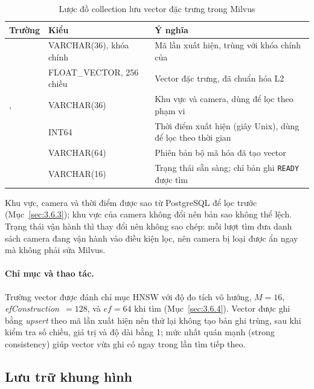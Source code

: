 \begin{table}[H]
\centering
\caption{Lược đồ collection lưu vector đặc trưng trong Milvus}
\label{tab:milvus-schema}
\begin{tabularx}{\textwidth}{|>{\raggedright\arraybackslash}p{4.2cm}|>{\raggedright\arraybackslash}p{3.7cm}|L|}
\hline
\textbf{Trường} & \textbf{Kiểu} & \textbf{Ý nghĩa} \\
\hline
{} & VARCHAR(36), khóa chính & Mã lần xuất hiện, trùng với khóa chính của  \\
\hline
{} & FLOAT\_VECTOR, 256 chiều & Vector đặc trưng, đã chuẩn hóa L2 \\
\hline
{},  & VARCHAR(36) & Khu vực và camera, dùng để lọc theo phạm vi \\
\hline
{} & INT64 & Thời điểm xuất hiện (giây Unix), dùng để lọc theo thời gian \\
\hline
{} & VARCHAR(64) & Phiên bản bộ mã hóa đã tạo vector \\
\hline
{} & VARCHAR(16) & Trạng thái sẵn sàng; chỉ bản ghi \texttt{READY} được tìm \\
\hline
\end{tabularx}
\end{table}

Khu vực, camera và thời điểm được sao từ PostgreSQL để lọc trước (Mục~\ref{sec:3.6.3}); khu vực của camera không đổi nên bản sao không thể lệch. Trạng thái vận hành thì thay đổi nên không sao chép: mỗi lượt tìm đưa danh sách camera đang vận hành vào điều kiện lọc, nên camera bị loại được ẩn ngay mà không phải sửa Milvus.

\paragraph{Chỉ mục và thao tác.} Trường vector được đánh chỉ mục HNSW với độ đo tích vô hướng, $M = 16$, \textit{ef\-Con\-struc\-tion}~$= 128$, và $\mathit{ef} = 64$ khi tìm (Mục~\ref{sec:3.6.4}). Vector được ghi bằng \emph{upsert} theo mã lần xuất hiện nên thử lại không tạo bản ghi trùng, sau khi kiểm tra số chiều, giá trị và độ dài bằng 1; mức nhất quán mạnh (strong consistency) giúp vector vừa ghi có ngay trong lần tìm tiếp theo.

\subsection{Lưu trữ khung hình}
\label{sec:5.3.3}

